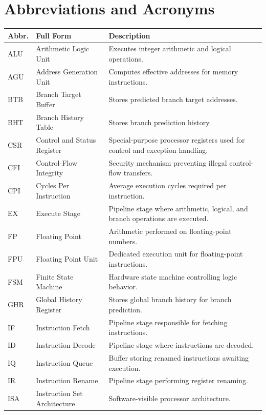 \chapter{Abbreviations and Acronyms}

\begingroup
\renewcommand{\arraystretch}{1.2}
\begin{longtable}{@{}p{}p{}p{}@{}}
\toprule
\textbf{Abbr.} & \textbf{Full Form} & \textbf{Description} \\
\midrule
\endhead
ALU & Arithmetic Logic Unit & Executes integer arithmetic and logical operations. \\
AGU & Address Generation Unit & Computes effective addresses for memory instructions. \\
BTB & Branch Target Buffer & Stores predicted branch target addresses. \\
BHT & Branch History Table & Stores branch prediction history. \\
CSR & Control and Status Register & Special-purpose processor registers used for control and exception handling. \\
CFI & Control-Flow Integrity & Security mechanism preventing illegal control-flow transfers. \\
CPI & Cycles Per Instruction & Average execution cycles required per instruction. \\
EX & Execute Stage & Pipeline stage where arithmetic, logical, and branch operations are executed. \\
FP & Floating Point & Arithmetic performed on floating-point numbers. \\
FPU & Floating Point Unit & Dedicated execution unit for floating-point instructions. \\
FSM & Finite State Machine & Hardware state machine controlling logic behavior. \\
GHR & Global History Register & Stores global branch history for branch prediction. \\
IF & Instruction Fetch & Pipeline stage responsible for fetching instructions. \\
ID & Instruction Decode & Pipeline stage where instructions are decoded. \\
IQ & Instruction Queue & Buffer storing renamed instructions awaiting execution. \\
IR & Instruction Rename & Pipeline stage performing register renaming. \\
ISA & Instruction Set Architecture & Software-visible processor architecture. \\

\end{longtable}
